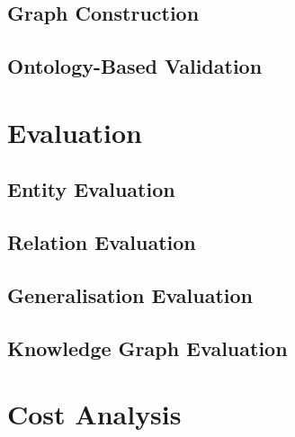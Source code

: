 \subsection{Graph Construction}
\label{subsec:meth:graph_construction}

\subsection{Ontology-Based Validation}
\label{subsec:meth:ontology_based_validation}

\section{Evaluation}
\label{sec:meth:evaluation}

\subsection{Entity Evaluation}
\label{subsec:meth:entity_evaluation}

\subsection{Relation Evaluation}
\label{subsec:meth:relation_evaluation}

\subsection{Generalisation Evaluation}
\label{subsec:meth:generalisation_evaluation}

\subsection{Knowledge Graph Evaluation}
\label{subsec:meth:knowledge_graph_evaluation}

\section{Cost Analysis}
\label{sec:meth:cost_analysis}
